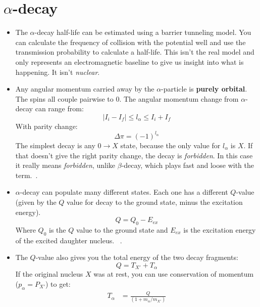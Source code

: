 \documentclass[letter]{article}
\begin{document}
\section{$\alpha$-decay}

\begin{itemize}
\item The $\alpha$-decay half-life can be estimated using a barrier
  tunneling model. You can calculate the frequency of collision with
  the potential well and use the transmission probability to calculate
  a half-life. This isn't the real model and only represents an
  electromagnetic baseline to give us insight into what is
  happening. It isn't \textit{nuclear}.~\cite[Lec. 18]{lecture}
\item Any angular momentum carried away by the $\alpha$-particle is
  \textbf{purely orbital}. The spins all couple pairwise to
  0. The angular momentum change from $\alpha$-decay can range from:
  \begin{equation*}
    |I_i-I_f| \leq l_{\alpha} \leq I_i + I_f
  \end{equation*}
With parity change:
\begin{equation*}
  \Delta\pi = {(-1)}^{l_{\alpha}}
\end{equation*}
The simplest decay is any $0 \to X$ state, because the only value
for $l_{\alpha}$ is $X$. If that doesn't give the right parity change,
the decay is \textit{forbidden}. In this case it really means
\textit{forbidden}, unlike $\beta$-decay, which plays fast and loose
with the term.~\cite[pp. 257-258]{krane}.
\item $\alpha$-decay can populate many different states. Each one has
  a different $Q$-value (given by the $Q$ value for decay to the
  ground state, minus the excitation
  energy).
  \begin{equation*}
    Q = Q_0 - E_{ex}
  \end{equation*}
Where $Q_0$ is the $Q$ value to the ground state and $E_{ex}$ is the
excitation energy of the excited daughter nucleus.
~\cite[pp. 257-258]{krane}.
\item The $Q$-value also gives you the total energy of the two decay
  fragments:
  \begin{equation*}
    Q=T_{X'}+T_{\alpha}
  \end{equation*}
If the original nucleus $X$ was at rest, you can use conservation of
momentum ($p_{\alpha}=P_{X'}$) to get:
\begin{equation*}
  \begin{split}
    T_{\alpha}&=\frac{Q}{(1+m_{\alpha}/m_{X'})} \\[10pt]

\end{split}
\end{equation*}
\end{itemize}
\end{document}
